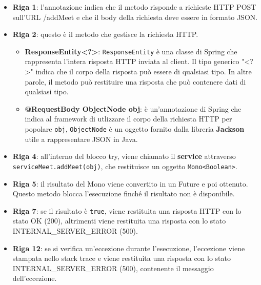 \begin{itemize}
    \item \textbf{Riga 1}:
    l'annotazione indica che il metodo risponde a richieste HTTP POST sull'URL /addMeet 
    e che il body della richiesta deve essere in formato JSON.
  
    \item \textbf{Riga 2}:
    questo è il metodo che gestisce la richiesta HTTP. 
        \begin{itemize}
            \item \textbf{ResponseEntity\textless{}?{}\textgreater{}}: \texttt{ResponseEntity} è una classe di Spring che 
            rappresenta l'intera risposta HTTP inviata al client. Il tipo generico "\textless{}?\textgreater{}" indica che il corpo 
            della risposta può essere di qualsiasi tipo. In altre parole, il metodo può restituire una risposta che può 
            contenere dati di qualsiasi tipo.
            
            \item \textbf{@RequestBody ObjectNode obj}: è un'annotazione di Spring che indica al framework di 
            utlizzare il corpo della richiesta HTTP per popolare \texttt{obj}, \texttt{ObjectNode} è un oggetto fornito 
            dalla libreria \textbf{Jackson} utile a rappresentare JSON in Java.
            
        \end{itemize}
  
    \item \textbf{Riga 4}:
    all'interno del blocco try, viene chiamato il \textbf{service} attraverso
    \texttt{serviceMeet.addMeet(obj)}, che restituisce un oggetto 
    \texttt{Mono\textless{}Boolean\textgreater{}}. 
  
    \item \textbf{Riga 5}:
    il risultato del Mono viene convertito in un Future e poi ottenuto. Questo metodo blocca l'esecuzione 
    finché il risultato non è disponibile.
  
    \item \textbf{Riga 7}:
    se il risultato è \texttt{true}, viene restituita una risposta HTTP con lo stato OK (200), altrimenti
    viene restituita una risposta con lo stato INTERNAL_SERVER_ERROR (500).
  
    \item \textbf{Riga 12}:
    se si verifica un'eccezione durante l'esecuzione, l'eccezione viene stampata nello stack trace e viene 
    restituita una risposta con lo stato INTERNAL_SERVER_ERROR (500), contenente il messaggio dell'eccezione.
  \end{itemize}
